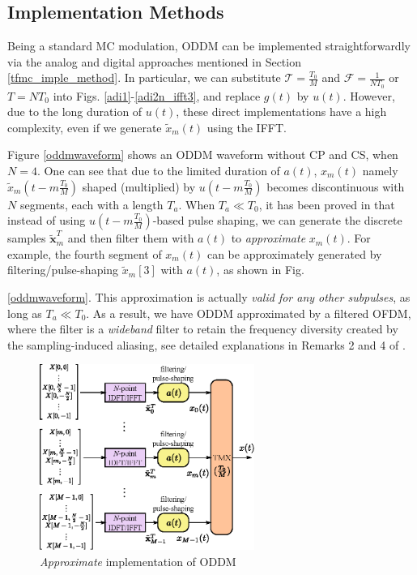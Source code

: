 \documentclass[journal]{IEEEtran}
\begin{document}
\subsection{Implementation Methods}
Being a standard MC modulation, ODDM can be implemented straightforwardly via the analog and digital approaches mentioned in Section \ref{tfmc_imple_method}. In particular, we can substitute $\mathcal T=\frac{T_0}{M}$ and  $\mathcal F=\frac{1}{NT_0}$ or $T=NT_0$ into Figs. \ref{adi1}-\ref{adi2n_ifft3}, and replace $g(t)$ by $u(t)$. However, due to the long duration of $u(t)$, these direct implementations have a high complexity, even if we generate $\tilde x_m(t)$ using the IFFT.



Figure \ref{oddmwaveform} shows an ODDM waveform without CP and CS, when $N=4$. One can see that due to the limited duration of $a(t)$, $x_m(t)$ namely $\tilde x _m(t-m\frac{T_0}{M})$ shaped (multiplied) by $u(t-m\frac{T_0}{M})$ becomes discontinuous with $N$ segments, {each with a length} $T_a$. When $T_a\ll T_0$, it has been proved in {\cite[Appendix A]{oddm}} that instead of {using} $u(t-m\frac{T_0}{M})$-based pulse shaping, we can generate the discrete samples $\tilde {\mathbf x}_m^T$ and then filter them with $a(t)$ to \emph{approximate} $x_m(t)$. For example, the fourth segment of $x_m(t)$ can be approximately generated by filtering/pulse-shaping $\tilde x_m[3]$ with $a(t)$, as shown in Fig. {\ref{oddmwaveform}. This approximation is actually \emph{valid for any other subpulses}, as long as $T_a\ll T_0$. As a result, we have ODDM approximated by a filtered OFDM, where the filter is a \emph{wideband} filter to retain the frequency diversity created by the sampling-induced aliasing, see detailed explanations in {Remarks 2 and 4} of \cite{oddm}. 


\begin{figure}
  \centering
  \includegraphics[width=7cm]{oddm_di1}
  \caption{\emph{Approximate} implementation of ODDM}
  \label{oddm_di1}
\end{figure}

}
\end{document}
